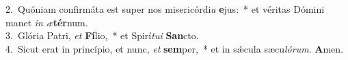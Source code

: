 {2.~}Quóniam confirmáta est super nos misericórdi\textit{a} \textbf{e}jus:~* et véritas Dómini manet \textit{in} \textit{æ}\textbf{tér}num.\\
{3.~}Glória Patri, \textit{et} \textbf{Fí}lio,~* et Spirí\textit{tu}\textit{i} \textbf{San}cto.\\
{4.~}Sicut erat in princípio, et nunc, \textit{et} \textbf{sem}per,~* et in sǽcula sæcu\textit{ló}\textit{rum}. \textbf{A}men.\\
